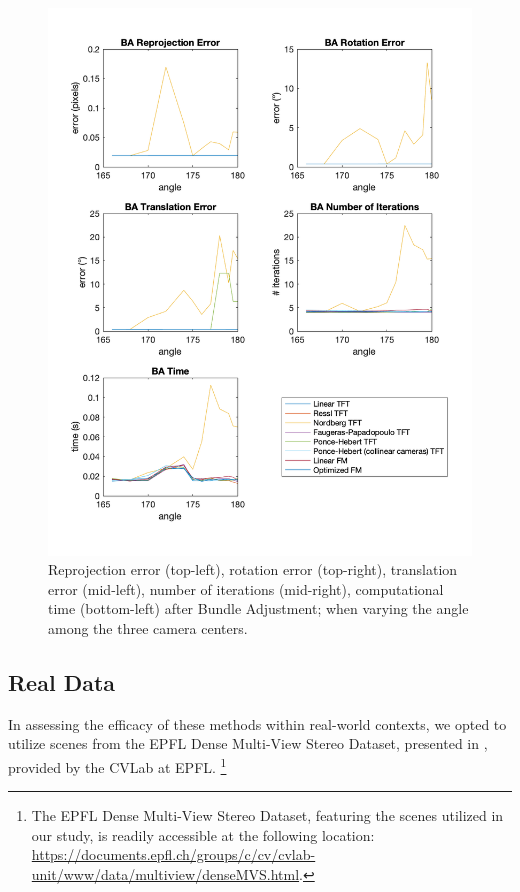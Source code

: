 \begin{figure}[p]
	\centering
	\includegraphics[width=1\textwidth]{Experiments/Synthetic/angle/BAanglePlots.png}
	\caption{Reprojection error (top-left), rotation error (top-right), translation error (mid-left), number of iterations (mid-right), computational time (bottom-left) after Bundle Adjustment; when varying the angle among the three camera centers.}
	\label{fig:BAAnglePlot}
\end{figure}

\pagebreak

\subsection{Real Data}
In assessing the efficacy of these methods within real-world contexts, we opted to utilize scenes from the EPFL Dense Multi-View Stereo Dataset, presented in \cite{13-epfl-dataset}, provided by the CVLab at EPFL. \footnote{The EPFL Dense Multi-View Stereo Dataset, featuring the scenes utilized in our study, is readily accessible at the following location: \href{https://documents.epfl.ch/groups/c/cv/cvlab-unit/www/data/multiview/denseMVS.html}{https://documents.epfl.ch/groups/c/cv/cvlab-unit/www/data/multiview/denseMVS.html}.}\\

